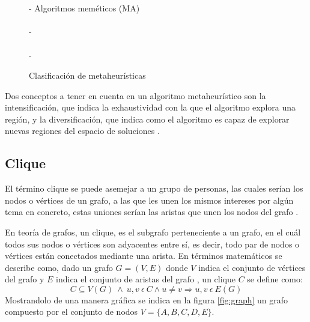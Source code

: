 \begin{figure}[H]
{{{				- Algoritmos meméticos (\gls{MA})\\
			}\\
			- \\
		}\\
		- \\
	}
	\caption{Clasificación de metaheurísticas}
	\label{fig:clasif-metahs}
\end{figure}

Dos conceptos a tener en cuenta en un algoritmo metaheurístico son la intensificación, que indica la exhaustividad con la que el algoritmo explora una región, y la diversificación, que indica como el algoritmo es capaz de explorar nuevas regiones del espacio de soluciones \cite{libro-metaheuristicas}.

\subsection{Clique}
\label{sec-clique}
El término clique se puede asemejar a un grupo de personas, las cuales serían los nodos o vértices de un grafo, a las que les unen los mismos intereses por algún tema en concreto, estas uniones serían las aristas que unen los nodos del grafo \cite{LUCE:1949}.

En teoría de grafos, un clique, es el subgrafo perteneciente a un grafo, en el cuál todos sus nodos o vértices son adyacentes entre sí, es decir, todo par de nodos o vértices están conectados mediante una arista. En términos matemáticos se describe como, dado un grafo $G = (V, E)$ donde $V$ indica el conjunto de vértices del grafo y $E$ indica el conjunto de aristas del grafo \cite{web-clique}, un clique $C$ se define como:
\[
C \subseteq V(G) ~ \wedge ~ u, v ~ \epsilon ~ C  \wedge  u  \neq v \Rightarrow u, v ~ \epsilon ~ E(G)
\]
Mostrandolo de una manera gráfica se indica en la figura  \ref{fig:graph} un grafo compuesto por el conjunto de nodos $V=\{A, B, C, D, E\}$.

